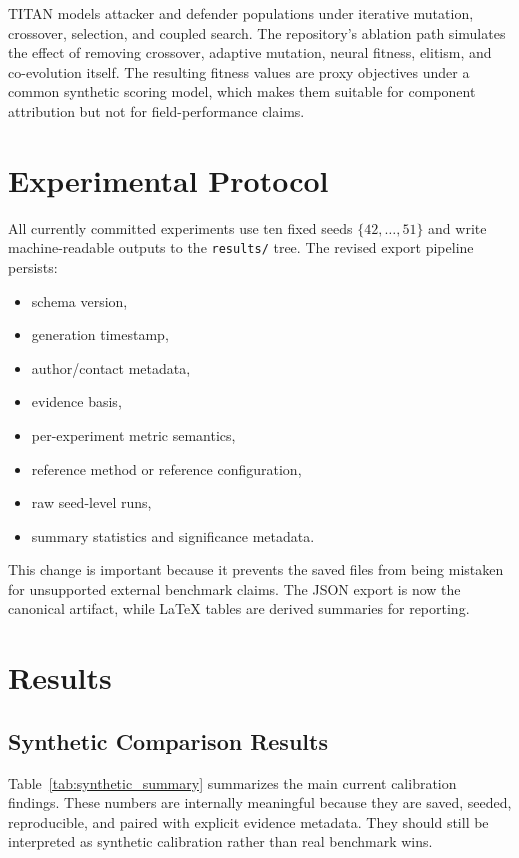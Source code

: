 \documentclass[conference]{IEEEtran}
\begin{document}
TITAN models attacker and defender populations under iterative mutation,
crossover, selection, and coupled search. The repository's ablation path
simulates the effect of removing crossover, adaptive mutation, neural fitness,
elitism, and co-evolution itself. The resulting fitness values are proxy
objectives under a common synthetic scoring model, which makes them suitable for
component attribution but not for field-performance claims.

\section{Experimental Protocol}

All currently committed experiments use ten fixed seeds $\{42,\dots,51\}$ and
write machine-readable outputs to the \texttt{results/} tree. The revised export
pipeline persists:
\begin{itemize}
  \item schema version,
  \item generation timestamp,
  \item author/contact metadata,
  \item evidence basis,
  \item per-experiment metric semantics,
  \item reference method or reference configuration,
  \item raw seed-level runs,
  \item summary statistics and significance metadata.
\end{itemize}

This change is important because it prevents the saved files from being mistaken
for unsupported external benchmark claims. The JSON export is now the canonical
artifact, while LaTeX tables are derived summaries for reporting.

\section{Results}

\subsection{Synthetic Comparison Results}

Table~\ref{tab:synthetic_summary} summarizes the main current calibration
findings. These numbers are internally meaningful because they are saved,
seeded, reproducible, and paired with explicit evidence metadata. They should
still be interpreted as synthetic calibration rather than real benchmark wins.
\end{document}
